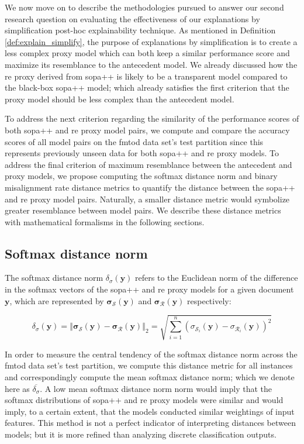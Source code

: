 We now move on to describe the methodologies pursued to answer our second
research question on evaluating the effectiveness of our explanations by
simplification post-hoc explainability technique. As mentioned in Definition
\ref{def:explain_simplify}, the purpose of explanations by simplification is to
create a less complex proxy model which can both keep a similar performance
score and maximize its resemblance to the antecedent model. We already discussed
how the \ac{re} proxy derived from \ac{sopa}++ is likely to be a transparent model
compared to the black-box \ac{sopa}++ model; which already satisfies the first
criterion that the proxy model should be less complex than the antecedent model.

To address the next criterion regarding the similarity of the performance scores
of both \ac{sopa}++ and \ac{re} proxy model pairs, we compute and compare the accuracy
scores of all model pairs on the \ac{fmtod} data set's test partition since this
represents previously unseen data for both \ac{sopa}++ and \ac{re} proxy models. To
address the final criterion of maximum resemblance between the antecedent and
proxy models, we propose computing the softmax distance norm and binary
misalignment rate distance metrics to quantify the distance between the \ac{sopa}++
and \ac{re} proxy model pairs. Naturally, a smaller distance metric would symbolize
greater resemblance between model pairs. We describe these distance metrics with
mathematical formalisms in the following sections.

\subsection{Softmax distance norm}

The softmax distance norm $\delta_{\sigma}(\bm{y})$ refers to the Euclidean norm
of the difference in the softmax vectors of the \ac{sopa}++ and \ac{re} proxy models for a
given document $\bm{y}$, which are represented by
$\bm{\sigma_{\mathcal{S}}}(\bm{y})$ and $\bm{\sigma_{\mathcal{R}}}(\bm{y})$
respectively:

\begin{equation}
  \delta_{\sigma}(\bm{y}) = \left\Vert \bm{\sigma_{\mathcal{S}}}(\bm{y}) - \bm{\sigma_{\mathcal{R}}}(\bm{y}) \right\Vert_{2} = \sqrt{\sum^n_{i=1} (\sigma_{\mathcal{S}_i}(\bm{y}) - \sigma_{\mathcal{R}_i}(\bm{y}))^2} 
\end{equation}

In order to measure the central tendency of the softmax distance norm across the
\ac{fmtod} data set's test partition, we compute this distance metric for all
instances and correspondingly compute the mean softmax distance norm; which we
denote here as $\overline{\delta_{\sigma}}$. A low mean softmax distance norm
norm would imply that the softmax distributions of \ac{sopa}++ and \ac{re} proxy models
were similar and would imply, to a certain extent, that the models conducted
similar weightings of input features. This method is not a perfect indicator of
interpreting distances between models; but it is more refined than analyzing
discrete classification outputs.

